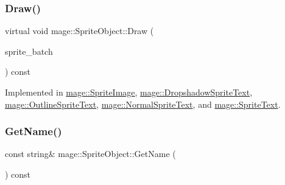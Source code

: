 \hypertarget{classmage_1_1_sprite_object_a1c1c885fe7846f7ee1cc0b73571c2fa0}{}\label{classmage_1_1_sprite_object_a1c1c885fe7846f7ee1cc0b73571c2fa0} 
\subsubsection{\texorpdfstring{Draw()}{Draw()}}
{\footnotesize\ttfamily virtual void mage\+::\+Sprite\+Object\+::\+Draw (\begin{DoxyParamCaption}\item[{Sprite\+Batch \&}]{sprite\+\_\+batch }\end{DoxyParamCaption}) const\hspace{0.3cm}{\ttfamily [pure virtual]}}



Implemented in \hyperlink{classmage_1_1_sprite_image_ae30d3293931f674fea17008063755bb6}{mage\+::\+Sprite\+Image}, \hyperlink{classmage_1_1_dropshadow_sprite_text_af76422c9812d7dc38e9b98e587103c67}{mage\+::\+Dropshadow\+Sprite\+Text}, \hyperlink{classmage_1_1_outline_sprite_text_a524e9ad1caeeeaa32405e61d1a5e1032}{mage\+::\+Outline\+Sprite\+Text}, \hyperlink{classmage_1_1_normal_sprite_text_ad2a1b02bea18afd6bf61b106a727a355}{mage\+::\+Normal\+Sprite\+Text}, and \hyperlink{classmage_1_1_sprite_text_a45d5ac8410d5a46b26e8491946a2ad9e}{mage\+::\+Sprite\+Text}.

\hypertarget{classmage_1_1_sprite_object_aceda3826a222603d30e2d2b827f491bb}{}\label{classmage_1_1_sprite_object_aceda3826a222603d30e2d2b827f491bb} 
\subsubsection{\texorpdfstring{Get\+Name()}{GetName()}}
{\footnotesize\ttfamily const string\& mage\+::\+Sprite\+Object\+::\+Get\+Name (\begin{DoxyParamCaption}{ }\end{DoxyParamCaption}) const}

\hypertarget{classmage_1_1_sprite_object_af759fd1b68e2707b0f084da183e0b5f1}{}\label{classmage_1_1_sprite_object_af759fd1b68e2707b0f084da183e0b5f1} 
